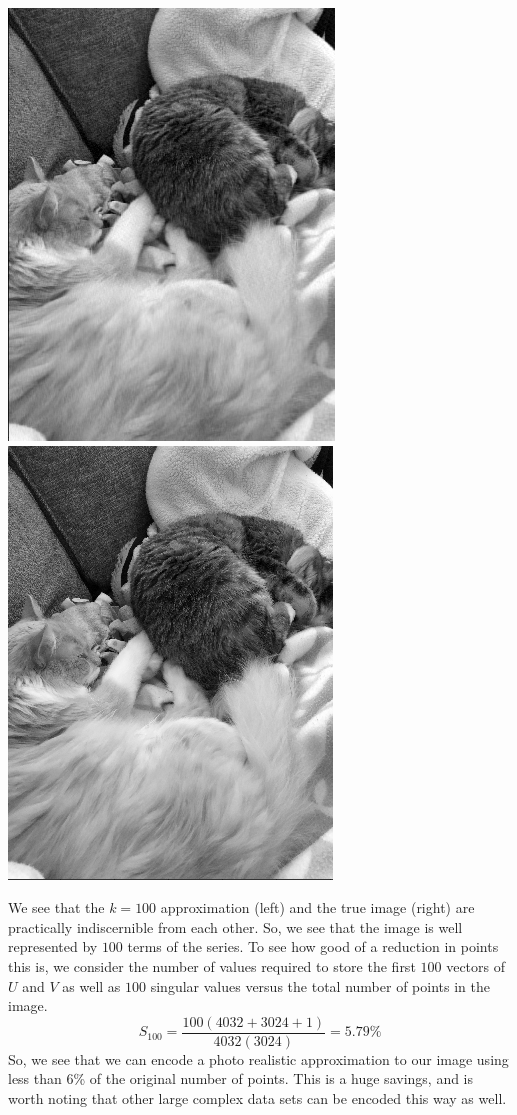 \documentclass[letterpaper,12pt]{article}
\begin{document}
\begin{center}
\includegraphics[scale=.6]{grey100.png}
\includegraphics[scale=.6]{RasandTheaGrey.png}
\end{center}
We see that the $k=100$ approximation (left) and the true image (right) are practically indiscernible from each other. So, we see that the image is well represented by $100$ terms of the series. To see how good of a reduction in points this is, we consider the number of values required to store the first $100$ vectors of $U$ and $V$ as well as $100$ singular values versus the total number of points in the image.
\[S_{100}=\frac{100(4032+3024+1)}{4032(3024)}=5.79\%\]
So, we see that we can encode a photo realistic approximation to our image using less than 6\% of the original number of points. This is a huge savings, and is worth noting that other large complex data sets can be encoded this way as well.
\end{document}
